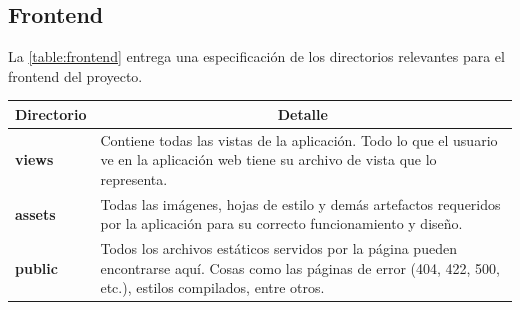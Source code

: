 \subsection{Frontend}
La \autoref{table:frontend} entrega una especificación de los directorios relevantes para el frontend del proyecto.

\begin{center}
  \begin{tabular}{ | l | p{12.5cm} |}
    \hline
    \multicolumn{1}{|c|}{\textbf{Directorio}} & \multicolumn{1}{|c|}{\textbf{Detalle}} \\
    \hline
    
    {\textbf{views}} & Contiene todas las vistas de la aplicación. Todo lo que el usuario ve en la aplicación web tiene su archivo de vista que lo representa. \\ \hline
    
    {\textbf{assets}} & Todas las imágenes, hojas de estilo y demás artefactos requeridos por la aplicación para su correcto funcionamiento y diseño. \\ \hline
    
    {\textbf{public}} & Todos los archivos estáticos servidos por la página pueden encontrarse aquí. Cosas como las páginas de error (404, 422, 500, etc.), estilos compilados, entre otros.\\ \hline
  \end{tabular}
  
  \label{table:frontend}
\end{center}
